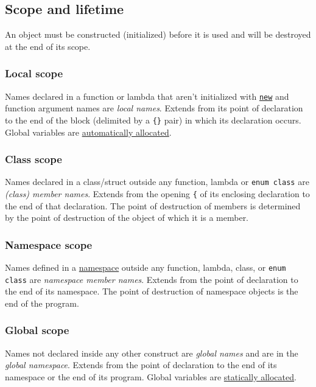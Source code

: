 \documentclass[8pt, table, xcdraw]{article}%
\begin{document}
\subsection{Scope and lifetime}

An object must be constructed (initialized) before it is used and will be destroyed at the end of its scope.

\subsubsection{Local scope} \label{localscope}
Names declared in a function or lambda that aren't initialized with \hyperref[new]{\lstinline{new}} and function argument names are \textit{local names}. Extends from its point of declaration to the end of the block (delimited by a \lstinline|{}| pair) in which its declaration occurs. Global variables are \hyperref[automaticallocation]{automatically allocated}.

\subsubsection{Class scope} \label{classscope}
Names declared in a class/struct outside any function, lambda or \lstinline{enum class} are \textit{(class) member names}. Extends  from  the  opening \texttt{\{} of its enclosing declaration to the end of that declaration. The point of destruction of members is  determined by the point of destruction of the object of which it is a member.

\subsubsection{Namespace scope} \label{namespacescope}
Names defined in a \hyperref[namespace]{namespace} outside any function, lambda, class, or \lstinline{enum class} are \textit{namespace member names}. Extends from the point of declaration to the end of its namespace. The point of destruction of namespace objects is the end of the program.

\subsubsection{Global scope} \label{globalscope}
Names not declared inside any other construct are \textit{global names} and are in the \textit{global namespace}. Extends from the point of declaration to the end of its namespace or the end of its program. Global variables are \hyperref[staticallocation]{statically allocated}.
\end{document}
